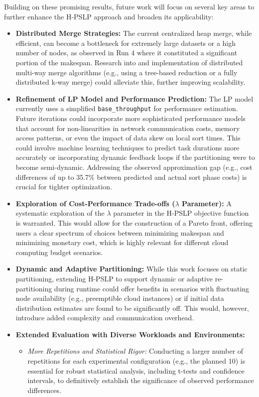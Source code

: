 \documentclass[]{interact}
\theoremstyle{plain}
\theoremstyle{definition}
\theoremstyle{remark}
\begin{document}
Building on these promising results, future work will focus on several key areas to further enhance the H-PSLP approach and broaden its applicability:
\begin{itemize}
    \item \textbf{Distributed Merge Strategies:} The current centralized heap merge, while efficient, can become a bottleneck for extremely large datasets or a high number of nodes, as observed in Run 4 where it constituted a significant portion of the makespan. Research into and implementation of distributed multi-way merge algorithms (e.g., using a tree-based reduction or a fully distributed k-way merge) could alleviate this, further improving scalability.
    \item \textbf{Refinement of LP Model and Performance Prediction:} The LP model currently uses a simplified \texttt{base\_throughput} for performance estimation. Future iterations could incorporate more sophisticated performance models that account for non-linearities in network communication costs, memory access patterns, or even the impact of data skew on local sort times. This could involve machine learning techniques to predict task durations more accurately or incorporating dynamic feedback loops if the partitioning were to become semi-dynamic. Addressing the observed approximation gap (e.g., cost differences of up to 35.7\% between predicted and actual sort phase costs) is crucial for tighter optimization.
    \item \textbf{Exploration of Cost-Performance Trade-offs ($\lambda$ Parameter):} A systematic exploration of the $\lambda$ parameter in the H-PSLP objective function is warranted. This would allow for the construction of a Pareto front, offering users a clear spectrum of choices between minimizing makespan and minimizing monetary cost, which is highly relevant for different cloud computing budget scenarios.
    \item \textbf{Dynamic and Adaptive Partitioning:} While this work focuses on static partitioning, extending H-PSLP to support dynamic or adaptive re-partitioning during runtime could offer benefits in scenarios with fluctuating node availability (e.g., preemptible cloud instances) or if initial data distribution estimates are found to be significantly off. This would, however, introduce added complexity and communication overhead.
    \item \textbf{Extended Evaluation with Diverse Workloads and Environments:}
    \begin{itemize}
        \item \textit{More Repetitions and Statistical Rigor:} Conducting a larger number of repetitions for each experimental configuration (e.g., the planned 10) is essential for robust statistical analysis, including t-tests and confidence intervals, to definitively establish the significance of observed performance differences.

\end{itemize}
\end{itemize}
\end{document}
